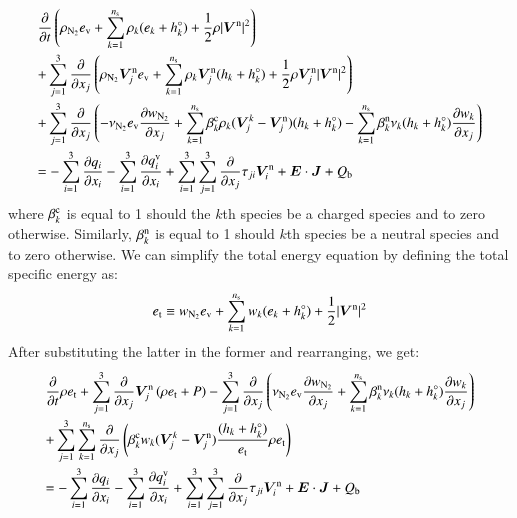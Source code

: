 \documentclass{warpdoc}
\newcommand{\alb}{\vspace{0.1cm}\\} %
\newcommand{\mfd}{\displaystyle}
\newcommand{\ns}{{n_{\rm s}}}
\newcommand{\ev}{{e_{\rm v}}}
\renewcommand{\vec}[1]{\bm{#1}}
\begin{document}
\begin{equation}
\begin{array}{l}\mfd
 \frac{\partial }{\partial t}\left(\rho_{\rm N_2} \ev+\sum_{k=1}^\ns \rho_k (e_k+h_k^\circ)+\frac{1}{2}\rho|\vec{V}^{\rm n}|^2 \right) \alb\mfd
+ \sum_{j=1}^3  \frac{\partial }{\partial x_j} \left(\rho_{\rm N_2} \vec{V}_j^{\rm n} \ev + \sum_{k=1}^\ns \rho_k \vec{V}^{\rm n}_j (h_k+h_k^\circ)+\frac{1}{2}\rho \vec{V}^{\rm n}_j|\vec{V}^{\rm n}|^2 \right)\alb\mfd
+ \sum_{j=1}^3  \frac{\partial }{\partial x_j} \left(-\nu_{\rm N_2} \ev\frac{\partial w_{\rm N_2}}{\partial x_j} + \sum_{k=1}^\ns \beta_k^{\rm c} \rho_k (\vec{V}^k_j-\vec{V}^{\rm n}_j) (h_k+h_k^\circ) 
- \sum_{k=1}^\ns \beta_k^{\rm n} \nu_k (h_k+h_k^\circ)\frac{\partial w_k}{\partial x_j} 
\right)
 \alb\mfd
=
-\sum_{i=1}^{3}\frac{\partial q_i}{\partial x_i}
-\sum_{i=1}^{3}\frac{\partial q_i^{\rm v}}{\partial x_i}
+\sum_{i=1}^3 \sum_{j=1}^3  \frac{\partial }{\partial x_j} \tau_{ji} \vec{V}_i^{\rm n}
+ \vec{E}\cdot\vec{J}
+ Q_{\rm b}
\end{array}
\label{eqn:etotal6}
\end{equation}
%  
where $\beta^{\rm c}_k$ is equal to 1 should the $k$th species be a charged species and to zero otherwise. Similarly, $\beta_k^{\rm n}$ is equal to 1 should $k$th species be a neutral species and to zero otherwise. We can simplify the total energy equation by defining the total specific energy as:
%
\begin{equation}
e_{\rm t} \equiv w_{\rm N_2} \ev + \sum_{k=1}^\ns w_k (e_k + h_k^\circ) +\frac{1}{2} |\vec{V}^{\rm n}|^2
\end{equation}
%
After substituting the latter in the former and rearranging, we get:
%
\begin{equation}
\begin{array}{l}\mfd
 \frac{\partial }{\partial t}\rho e_{\rm t}
+ \sum_{j=1}^3  \frac{\partial }{\partial x_j} \vec{V}_j^{\rm n} \left(\rho  e_{\rm t} +  P \right)
- \sum_{j=1}^3  \frac{\partial }{\partial x_j} \left(
   \nu_{\rm N_2} \ev\frac{\partial w_{\rm N_2}}{\partial x_j} + \sum_{k=1}^\ns \beta_k^{\rm n} \nu_k (h_k+h_k^\circ)\frac{\partial w_k}{\partial x_j} 
\right)
 \alb\mfd
+ \sum_{j=1}^3 \sum_{k=1}^\ns  \frac{\partial }{\partial x_j} \left(
  \beta_k^{\rm c} w_k (\vec{V}^k_j-\vec{V}^{\rm n}_j) \frac{(h_k+h_k^\circ)}{e_{\rm t}} \rho e_{\rm t} 
\right)\alb\mfd
=
-\sum_{i=1}^{3}\frac{\partial q_i}{\partial x_i}
-\sum_{i=1}^{3}\frac{\partial q_i^{\rm v}}{\partial x_i}
+\sum_{i=1}^3 \sum_{j=1}^3  \frac{\partial }{\partial x_j} \tau_{ji} \vec{V}_i^{\rm n}
+ \vec{E}\cdot\vec{J}
+ Q_{\rm b}
\end{array}
\label{eqn:etotal7}
\end{equation}
\end{document}
